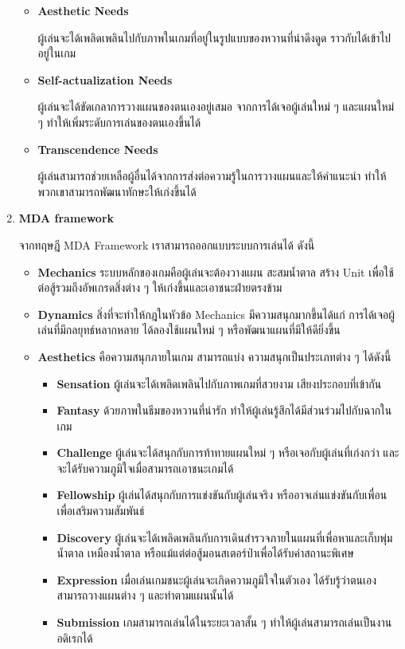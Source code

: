 \documentclass[12pt,oneside,openright,a4paper]{cpe-thai-project}
\begin{document}
\begin{enumerate}
\begin{itemize}
    \item \textbf{Aesthetic Needs} 
    
    ผู้เล่นจะได้เพลิดเพลินไปกับภาพในเกมที่อยู่ในรูปแบบของหวานที่น่าดึงดูด ราวกับได้เข้าไปอยู่ในเกม
    
    \item \textbf{Self-actualization Needs} 
    
    ผู้เล่นจะได้ขัดเกลาการวางแผนของตนเองอยู่เสมอ จากการได้เจอผู้เล่นใหม่ ๆ และแผนใหม่ ๆ ทำให้เพิ่มระดับการเล่นของตนเองขึ้นได้
    
    \item \textbf{Transcendence Needs} 
    
    ผู้เล่นสามารถช่วยเหลือผู้อื่นได้จากการส่งต่อความรู้ในการวางแผนและให้คำแนะนำ ทำให้พวกเขาสามารถพัฒนาทักษะให้เก่งขึ้นได้
  \end{itemize}


  \item \textbf{MDA framework}
  
  จากทฤษฎี MDA Framework เราสามารถออกแบบระบบการเล่นได้ ดังนี้

  \begin{itemize}
    \item \textbf{Mechanics} ระบบหลักของเกมคือผู้เล่นจะต้องวางแผน 
    สะสมน้ำตาล สร้าง Unit เพื่อใช้ต่อสู้รวมถึงอัพเกรดสิ่งต่าง ๆ 
    ให้เก่งขึ้นและเอาชนะฝ่ายตรงข้าม
    \item \textbf{Dynamics} สิ่งที่จะทำให้กฎในหัวข้อ Mechanics 
    มีความสนุกมากขึ้นได้แก่ การได้เจอผู้เล่นที่มีกลยุทธ์หลากหลาย ได้ลองใช้แผนใหม่ ๆ 
    หรือพัฒนาแผนที่มีให้ดียิ่งขึ้น
    \item \textbf{Aesthetics} คือความสนุกภายในเกม สามารถแบ่ง
    ความสนุกเป็นประเภทต่าง ๆ ได้ดังนี้

    \begin{itemize}
      \item \textbf{Sensation}  ผู้เล่นจะได้เพลิดเพลินไปกับภาพเกมที่สวยงาม เสียงประกอบที่เข้ากัน 
      \item \textbf{Fantasy}  ด้วยภาพในธีมของหวานที่น่ารัก ทำให้ผู้เล่นรู้สึกได้มีส่วนร่วมไปกับฉากในเกม
      \item \textbf{Challenge}  ผู้เล่นจะได้สนุกกับการท้าทายแผนใหม่ ๆ หรือเจอกับผู้เล่นที่เก่งกว่า และจะได้รับความภูมิใจเมื่อสามารถเอาชนะเกมได้
      \item \textbf{Fellowship}  ผู้เล่นได้สนุกกับการแข่งขันกับผู้เล่นจริง หรืออาจเล่นแข่งขันกับเพื่อนเพื่อเสริมความสัมพันธ์
      \item \textbf{Discovery}  ผู้เล่นจะได้เพลิดเพลินกับการเดินสำรวจภายในแผนที่เพื่อหาและเก็บพุ่มน้ำตาล เหมืองน้ำตาล หรือแม้แต่ต่อสู้มอนสเตอร์ป่าเพื่อได้รับค่าสถานะพิเศษ
      \item \textbf{Expression}  เมื่อเล่นเกมชนะผู้เล่นจะเกิดความภูมิใจในตัวเอง ได้รับรู้ว่าตนเองสามารถวางแผนต่าง ๆ และทำตามแผนนั้นได้
      \item \textbf{Submission}  เกมสามารถเล่นได้ในระยะเวลาสั้น ๆ ทำให้ผู้เล่นสามารถเล่นเป็นงานอดิเรกได้	
    \end{itemize}
  \end{itemize}


\end{enumerate}
\end{document}
